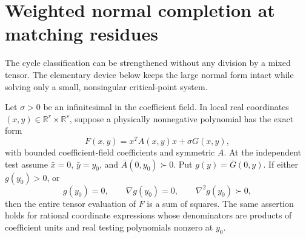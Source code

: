 \section{Weighted normal completion at matching residues}\label{sec:zero-d-weighted}
The cycle classification can be strengthened without any division by a mixed tensor. The elementary device below keeps the large normal form intact while solving only a small, nonsingular critical-point system.

\begin{lemma}\label{lem:weighted-contact}
Let $\sigma>0$ be an infinitesimal in the coefficient field. In local real coordinates $(x,y)\in\mathbb R^r\times\mathbb R^s$, suppose a physically nonnegative polynomial has the exact form
\[
F(x,y)=x^TA(x,y)x+\sigma G(x,y),
\]
with bounded coefficient-field coefficients and symmetric $A$. At the independent test assume $\bar x=0$, $\bar y=y_0$, and $\bar A(0,y_0)\succ0$. Put $g(y)=\overline{G}(0,y)$. If either $g(y_0)>0$, or
\[
g(y_0)=0,\qquad \nabla g(y_0)=0,\qquad \nabla^2g(y_0)\succ0,
\]
then the entire tensor evaluation of $F$ is a sum of squares. The same assertion holds for rational coordinate expressions whose denominators are products of coefficient units and real testing polynomials nonzero at $y_0$.
\end{lemma}
